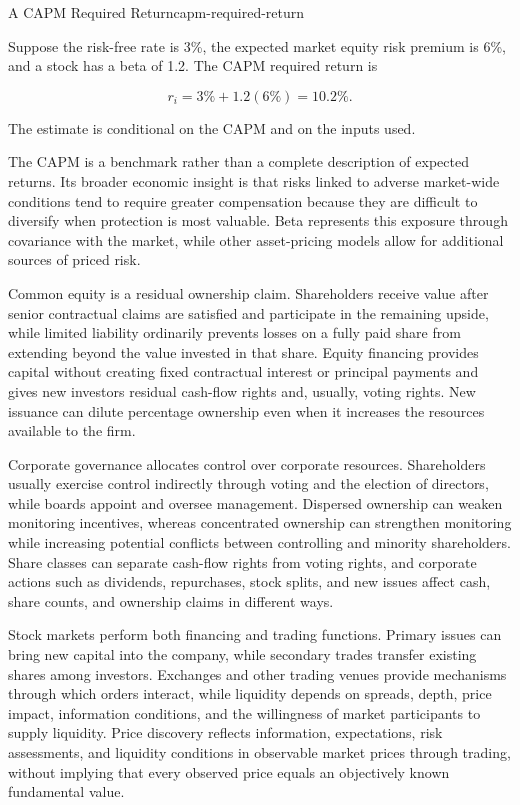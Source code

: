 \begin{example}{A CAPM Required Return}{capm-required-return}

Suppose the risk-free rate is 3\%, the expected market equity risk premium is 6\%, and a stock has a beta of 1.2. The CAPM required return is

\[
r_i
=
3\%+1.2(6\%)
=
10.2\%.
\]

The estimate is conditional on the CAPM and on the inputs used.

\end{example}

The CAPM is a benchmark rather than a complete description of expected returns. Its broader economic insight is that risks linked to adverse market-wide conditions tend to require greater compensation because they are difficult to diversify when protection is most valuable. Beta represents this exposure through covariance with the market, while other asset-pricing models allow for additional sources of priced risk.



Common equity is a residual ownership claim. Shareholders receive value after senior contractual claims are satisfied and participate in the remaining upside, while limited liability ordinarily prevents losses on a fully paid share from extending beyond the value invested in that share. Equity financing provides capital without creating fixed contractual interest or principal payments and gives new investors residual cash-flow rights and, usually, voting rights. New issuance can dilute percentage ownership even when it increases the resources available to the firm.

Corporate governance allocates control over corporate resources. Shareholders usually exercise control indirectly through voting and the election of directors, while boards appoint and oversee management. Dispersed ownership can weaken monitoring incentives, whereas concentrated ownership can strengthen monitoring while increasing potential conflicts between controlling and minority shareholders. Share classes can separate cash-flow rights from voting rights, and corporate actions such as dividends, repurchases, stock splits, and new issues affect cash, share counts, and ownership claims in different ways.

Stock markets perform both financing and trading functions. Primary issues can bring new capital into the company, while secondary trades transfer existing shares among investors. Exchanges and other trading venues provide mechanisms through which orders interact, while liquidity depends on spreads, depth, price impact, information conditions, and the willingness of market participants to supply liquidity. Price discovery reflects information, expectations, risk assessments, and liquidity conditions in observable market prices through trading, without implying that every observed price equals an objectively known fundamental value.

